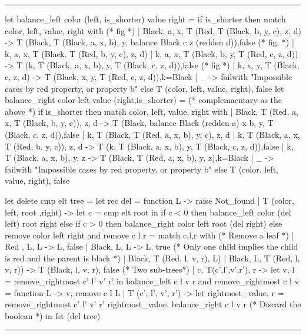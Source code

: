 \documentclass[10pt,a4paper]{article}
\newenvironment{codeblock}%
{\center \minipage{\textwidth} \vspace{6pt} \hrule \vspace{6pt} \minted{ocaml}}%
{\endminted \hrule \vspace{6pt} \endminipage \endcenter}
\begin{document}
\begin{codeblock}
   let balance_left color (left, is_shorter) value right =
   if is_shorter then
   match color, left, value, right with
   (* fig *)
   | Black, a, x, T (Red, T (Black, b, y, c), z, d)
   -> T (Black, T (Black, a, x, b), y, balance Black c z (redden d)),false
   (* fig.  *)
   | k, a, x, T (Black, T (Red, b, y, c), z, d)
   | k, a, x, T (Black, b, y, T (Red, c, z, d))
   -> T (k, T (Black, a, x, b), y, T (Black, c, z, d)),false
   (* fig *)
   | k, x, y, T (Black, c, z, d)
   -> T (Black, x, y, T (Red, c, z, d)),k=Black
   | _ -> failwith "Impossible cases by red property, or property b"
   else
   T (color, left, value, right), false
   let balance_right color left value (right,is_shorter) =
   (* complemaentary as the above *)
   if is_shorter then
   match color, left, value, right with
   | Black, T (Red, a, x, T (Black, b, y, c)), z, d
   -> T (Black, balance Black (redden a) x b, y, T (Black, c, z, d)),false
   | k, T (Black, T (Red, a, x, b), y, c), z, d
   | k, T (Black, a, x, T (Red, b, y, c)), z, d
   -> T (k, T (Black, a, x, b), y, T (Black, c, z, d)),false
   | k, T (Black, a, x, b), y, z
   -> T (Black, T (Red, a, x, b), y, z),k=Black
   | _ -> failwith "Impossible cases by red property, or property b"
   else
   T (color, left, value, right), false

   let delete cmp elt tree =
   let rec del = function
   L -> raise Not_found
   | T (color, left, root ,right) ->
   let c = cmp elt root in
   if c < 0 then balance_left color (del left) root right
   else if c > 0 then balance_right color left root (del right)
   else remove color left right
   and remove c l r = match c,l,r with
   (* Remove a leaf *)
   | Red  , L, L -> L, false
   | Black, L, L -> L, true
   (* Only one child implies the child is red and the parent is black *)
   | Black, T (Red, l, v, r), L)
   | Black, L, T (Red, l, v, r)) -> T (Black, l, v, r), false
   (* Two sub-trees*)
   | c, T(c',l',v',r'), r ->
   let v, l = remove_rightmost c' l' v' r' in
   balance_left c l v r
   and remove_rightmost c l v = function
   L -> v, remove c l L
   | T (c', l', v', r') ->
   let rightmost_value, r = remove_rightmost c' l' v' r'
   rightmost_value, balance_right c l v r
   (* Discard the boolean *)
   in fst (del tree)
\end{codeblock}
\end{document}
